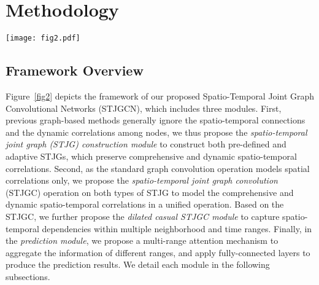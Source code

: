 \documentclass[10pt,journal,compsoc]{IEEEtran}
\begin{document}
\section{Methodology} \label{Methodology}

\begin{figure*}
	\centering
	\texttt{[image: fig2.pdf]}
	\caption{The framework of \textit{Spatio-Temporal Joint Graph Convolutional Networks} (STJGCN). It consists of three modules: (i) the \textit{STJG construction module} (detailed in section~\ref{STJG Construction Module}) constructs both pre-defined and adaptive \textit{spatio-temporal joint graphs} (STJGs); (ii) the \textit{dilated causal STJGC module} (detailed in section~\ref{Dilated Causal STJGC Module}) stacks dilated causal \textit{spatio-temporal joint graph convolution} (STJGC) layers to capture multiple ranges of spatio-temporal dependencies; (iii) the \textit{prediction module} (detailed in section~\ref{Prediction Module}) aggregates the information of different ranges via a multi-range attention mechanism and produces the prediction results using fully-connected layers.}
	\label{fig2}
\end{figure*}

\subsection{Framework Overview} 

Figure~\ref{fig2} depicts the framework of our proposed Spatio-Temporal Joint Graph Convolutional Networks (STJGCN), which includes three modules. First, previous graph-based methods generally ignore the spatio-temporal connections and the dynamic correlations among nodes, we thus propose the \textit{spatio-temporal joint graph (STJG) construction module} to construct both pre-defined and adaptive STJGs, which preserve comprehensive and dynamic spatio-temporal correlations. Second, as the standard graph convolution operation models spatial correlations only, we propose the \textit{spatio-temporal joint graph convolution} (STJGC) operation on both types of STJG to model the comprehensive and dynamic spatio-temporal correlations in a unified operation. Based on the STJGC, we further propose the \textit{dilated casual STJGC module} to capture spatio-temporal dependencies within multiple neighborhood and time ranges. Finally, in the \textit{prediction module}, we propose a multi-range attention mechanism to aggregate the information of different ranges, and apply fully-connected layers to produce the prediction results. We detail each module in the following subsections.
\end{document}
